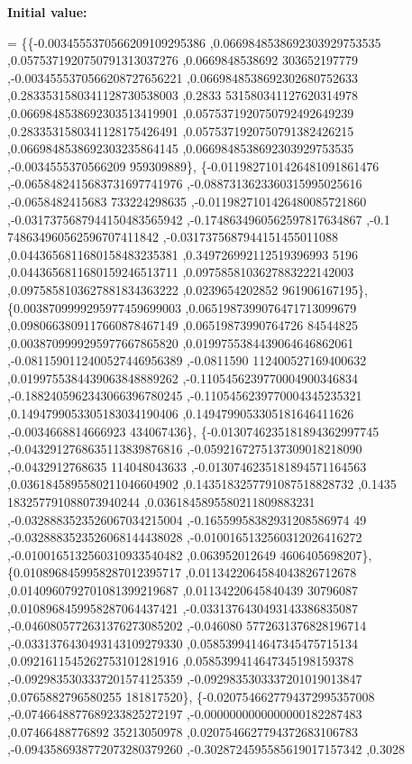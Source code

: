 {\bfseries Initial value\+:}
\begin{DoxyCode}
= \{\{-0.0034555370566209109295386 ,0.0669848538692303929753535 ,0.0575371920750791313037276 ,0.0669848538692
      303652197779 ,-0.0034555370566208727656221 ,0.0669848538692302680752633 ,0.2833531580341128730538003 ,0.2833
      531580341127620314978 ,0.0669848538692303513419901 ,0.0575371920750792492649239 ,0.2833531580341128175426491
       ,0.0575371920750791382426215 ,0.0669848538692303235864145 ,0.0669848538692303929753535 ,-0.0034555370566209
      959309889\},
\{-0.0119827101426481091861476 ,-0.0658482415683731697741976 ,-0.0887313623360315995025616 ,-0.0658482415683
      733224298635 ,-0.0119827101426480085721860 ,-0.0317375687944150483565942 ,-0.1748634960562597817634867 ,-0.1
      748634960562596707411842 ,-0.0317375687944151455011088 ,0.0443656811680158483235381 ,0.349726992112519396993
      5196 ,0.0443656811680159246513711 ,0.0975858103627883222142003 ,0.0975858103627881834363222 ,0.0239654202852
      961906167195\},
\{0.0038709999295977459699003 ,0.0651987399076471713099679 ,0.0980663809117660878467149 ,0.06519873990764726
      84544825 ,0.0038709999295977667865820 ,0.0199755384439064646862061 ,-0.0811590112400527446956389 ,-0.0811590
      112400527169400632 ,0.0199755384439063848889262 ,-0.1105456239770004900346834 ,-0.1882405962343066396780245 
      ,-0.1105456239770004345235321 ,0.1494799053305183034190406 ,0.1494799053305181646411626 ,-0.0034668814666923
      434067436\},
\{-0.0130746235181894362997745 ,-0.0432912768635113839876816 ,-0.0592167275137309018218090 ,-0.0432912768635
      114048043633 ,-0.0130746235181894571164563 ,0.0361845895580211046604902 ,0.1435183257791087518828732 ,0.1435
      183257791088073940244 ,0.0361845895580211809883231 ,-0.0328883523526067034215004 ,-0.16559958382931208586974
      49 ,-0.0328883523526068144438028 ,-0.0100165132560312026416272 ,-0.0100165132560310933540482 ,0.063952012649
      4606405698207\},
\{0.0108968459958287012395717 ,0.0113422064584043826712678 ,0.0140960792701081399219687 ,0.01134220645840439
      30796087 ,0.0108968459958287064437421 ,-0.0331376430493143386835087 ,-0.0460805772631376273085202 ,-0.046080
      5772631376828196714 ,-0.0331376430493143109279330 ,0.0585399414647345475715134 ,0.0921611545262753101281916 
      ,0.0585399414647345198159378 ,-0.0929835303337201574125359 ,-0.0929835303337201019013847 ,0.0765882796580255
      181817520\},
\{-0.0207546627794372995357008 ,-0.0746648877689233825272197 ,-0.0000000000000000182287483 ,0.07466488776892
      35213050978 ,0.0207546627794372683106783 ,-0.0943586938772073280379260 ,-0.3028724595585619017157342 ,0.3028

\end{DoxyCode}
